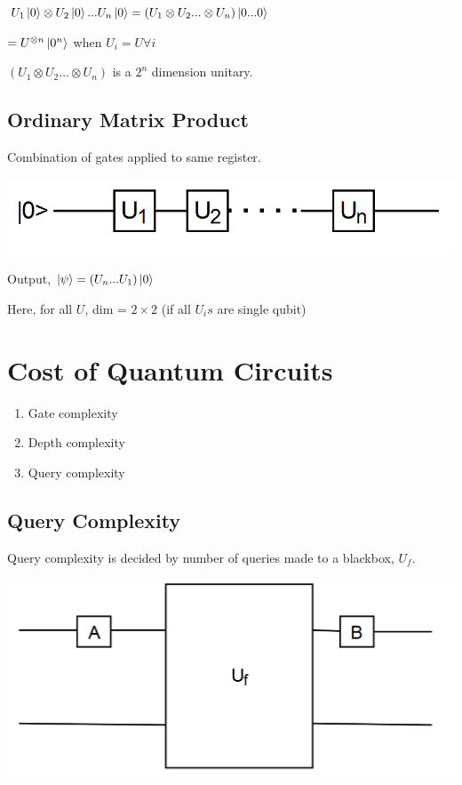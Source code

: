 \documentclass{article}
\begin{document}
\begin{center}
$    U_{1} \ket{0} \otimes U_{2} \ket{0} ... U_{n} \ket{0}
    = (U_{1} \otimes U_{2} ... \otimes U_{n}) \ket{0...0}$


    $= U^{\otimes n} \ket{0^{n}}$ when $U_{i}=U \forall i$
    
\end{center}

$(U_{1} \otimes U_{2} ... \otimes U_{n}) $ is a $2^{n}$ dimension unitary.

\subsection{Ordinary Matrix Product}
Combination of gates applied to same register.

\includegraphics[scale=0.5]{q2.png}

Output, $\ket{\psi} = (U_{n}...U_{1})\ket{0}$

Here, for all $U$, dim = $2 \times 2 $ (if all $U_{i}s$ are single qubit)

\section{Cost of Quantum Circuits}

\begin{enumerate}
    \item Gate complexity
    \item Depth complexity 
    \item Query complexity
\end{enumerate}
\subsection{Query Complexity}
Query complexity is decided by number of queries made to a blackbox, $U_{f}$.

\includegraphics[scale=0.3]{q3.png}
\end{document}
